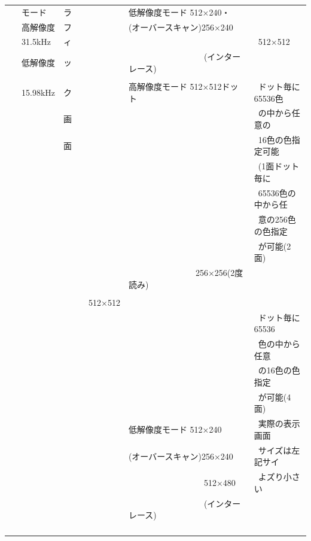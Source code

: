 \documentclass[twoside,a4paper,12pt]{article}
\begin{document}
\begin{tabular}{|p{13mm}|p{23mm}|p{4mm}|p{20mm}|p{65mm}|p{36mm}|}
& \ モード & ラ & & 低解像度モード 512×240・ &\\[2mm]
& \ 高解像度 & フ & & (オーバースキャン)256×240 &\\[2mm]
& \ 31.5kHz & ィ & & & \ 512×512\\[2mm]
& \ 低解像度 & ッ & & \ \ \ \ \ \ \ \ \ \ \ \ \ \ \ \ \ \ (インターレース) &\\
\cline{5-6}
& & & & &\\[-4mm]
& \ 15.98kHz & ク & & 高解像度モード 512×512ドット & \ ドット毎に65536色\\
& & 画 & & & \ の中から任意の\\
& & 面 & & & \ 16色の色指定可能\\
& & & & & \ (1面ドット毎に\\
& & & & & \ 65536色の中から任\\
& & & & & \ 意の256色の色指定\\
& & & & & \ が可能(2面)\\
& & & & \ \ \ \ \ \ \ \ \ \ \ \ \ \ \ \ 256×256(2度読み) &\\
& & & & &\\
& & & \ \ 512×512 & &\\
& & & & & \ ドット毎に65536\\
& & & & & \ 色の中から任意\\
& & & & & \ の16色の色指定\\
& & & & & \ が可能(4面)\\
& & & & 低解像度モード 512×240	& \ 実際の表示画面\\
& & & & (オーバースキャン)256×240 & \ サイズは左記サイ\\
& & & & \ \ \ \ \ \ \ \ \ \ \ \ \ \ \ \ \ \ 512×480 & \ よズり小さい\\
& & & & \ \ \ \ \ \ \ \ \ \ \ \ \ \ \ \ \ \ (インターレース) &\\
& & & & &\\
& & & & &\\
& & & & &\\
& & & & &\\
\hline
\end{tabular}

\newpage
\end{document}
